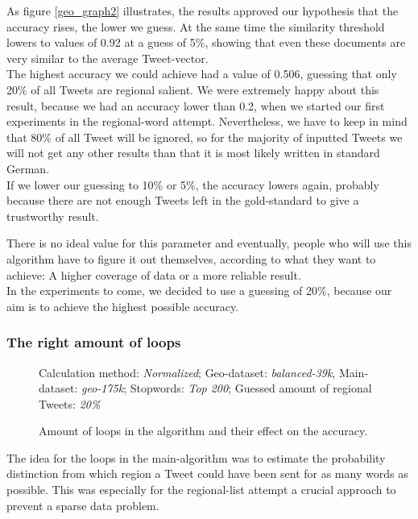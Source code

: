 \documentclass[../Main.tex]{subfiles}
\begin{document}
As figure \ref{geo_graph2} illustrates, the results approved our hypothesis that the accuracy rises, the lower we guess. At the same time the similarity threshold lowers to values of 0.92 at a guess of 5\%, showing that even these documents are very similar to the average Tweet-vector. \\
The highest accuracy we could achieve had a value of 0.506, guessing that only 20\% of all Tweets are regional salient. We were extremely happy about this result, because we had an accuracy lower than 0.2, when we started our first experiments in the regional-word attempt. Nevertheless, we have to keep in mind that 80\% of all Tweet will be ignored, so for the majority of inputted Tweets we will not get any other results than that it is most likely written in standard German. \\
If we lower our guessing to 10\% or 5\%, the accuracy lowers again, probably because there are not enough Tweets left in the gold-standard to give a trustworthy result. 

There is no ideal value for this parameter and eventually, people who will use this algorithm have to figure it out themselves, according to what they want to achieve: A higher coverage of data or a more reliable result. \\
In the experiments to come, we decided to use a guessing of 20\%, because our aim is to achieve the highest possible accuracy.

\subsubsection{The right amount of loops}
\begin{figure}

Calculation method: \textit{Normalized}; Geo-dataset: \textit{balanced-39k}, Main-dataset: \textit{geo-175k}; Stopwords: \textit{Top 200}; Guessed amount of regional Tweets: \textit{20\%}
  \caption{Amount of loops in the algorithm and their effect on the accuracy.}
  \label{geo_graph3}
\end{figure}
The idea for the loops in the main-algorithm was to estimate the probability distinction from which region a Tweet could have been sent for as many words as possible. This was especially for the regional-list attempt a crucial approach to prevent a sparse data problem.
\end{document}
